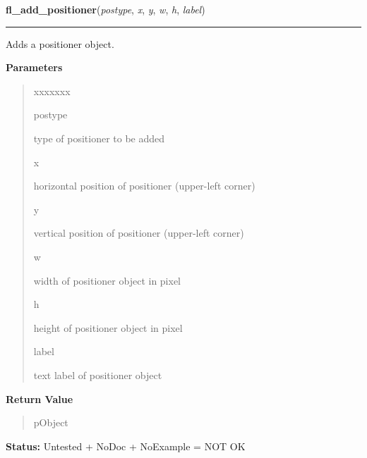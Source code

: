     \label{xformslib:library:fl_add_positioner}

    \vspace{0.5ex}

\hspace{.8\funcindent}\begin{boxedminipage}{\funcwidth}

    \raggedright \textbf{fl\_add\_positioner}(\textit{postype}, \textit{x}, \textit{y}, \textit{w}, \textit{h}, \textit{label})

    \vspace{-1.5ex}

    \rule{\textwidth}{0.5\fboxrule}
\setlength{\parskip}{2ex}
    Adds a positioner object.

\setlength{\parskip}{1ex}
      \textbf{Parameters}
      \vspace{-1ex}

      \begin{quote}
        \begin{Ventry}{xxxxxxx}

          \item[postype]

          type of positioner to be added

          \item[x]

          horizontal position of positioner (upper-left corner)

          \item[y]

          vertical position of positioner (upper-left corner)

          \item[w]

          width of positioner object in pixel

          \item[h]

          height of positioner object in pixel

          \item[label]

          text label of positioner object

        \end{Ventry}

      \end{quote}

      \textbf{Return Value}
    \vspace{-1ex}

      \begin{quote}
      pObject

      \end{quote}

\textbf{Status:} Untested + NoDoc + NoExample = NOT OK



    \end{boxedminipage}

